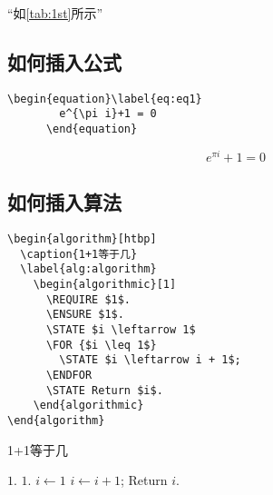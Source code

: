 “如\cref{tab:1st}所示”


\subsection{如何插入公式}

\begin{center}
  \begin{minipage}{0.85\textwidth}
    \begin{Verbatim}[frame=single]
      \begin{equation}\label{eq:eq1}
        e^{\pi i}+1 = 0
      \end{equation}
    \end{Verbatim}
  \end{minipage}
\end{center}

      \begin{equation}\label{eq:eq1}
        e^{\pi i}+1 = 0
      \end{equation}

\subsection{如何插入算法}

\begin{center}
  \begin{minipage}{0.85\textwidth}
    \begin{Verbatim}[frame=single]
\begin{algorithm}[htbp]
  \caption{1+1等于几}
  \label{alg:algorithm}
    \begin{algorithmic}[1]
      \REQUIRE $1$.
      \ENSURE $1$.
      \STATE $i \leftarrow 1$
      \FOR {$i \leq 1$}
        \STATE $i \leftarrow i + 1$;
      \ENDFOR
      \STATE Return $i$.
    \end{algorithmic}
\end{algorithm}
    \end{Verbatim}
  \end{minipage}
\end{center}

\begin{algorithm}[htbp]
\caption{1+1等于几}
\label{alg:algorithm}
\begin{algorithmic}[1]
\REQUIRE $1$.
\ENSURE $1$.
\STATE $i \leftarrow 1$
\STATE $i \leftarrow i + 1$;
\ENDFOR
\STATE Return $i$.
\end{algorithmic}
\end{algorithm}
